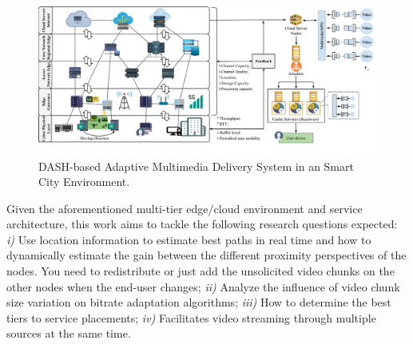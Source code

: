 \vspace{1cm}
\begin{figure}[htpb]
	\centering
	\includegraphics[width=1.0\textwidth]{images/scenario_incomplete}
	\vspace{-1cm}
	\caption{DASH-based Adaptive Multimedia Delivery System in an Smart City Environment.}
	\label{fig:scenario-arch}
\end{figure}



Given the aforementioned multi-tier edge/cloud environment and service architecture, this work aims to tackle the following research questions expected:
\textit{i)} Use location information to estimate best paths in real time and how to dynamically estimate the gain between the different proximity perspectives of the nodes. You need to redistribute or just add the unsolicited video chunks on the other nodes when the end-user changes; \textit{ii)} Analyze the influence of video chunk size variation on bitrate adaptation algorithms; \textit{iii)} How to determine the best tiers to service placements; \textit{iv)} Facilitates video streaming through multiple sources at the same time.

